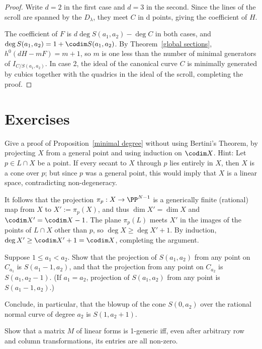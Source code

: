 \begin{proof} Write $d=2$ in the first case and $d=3$ in the second.
Since the lines of the scroll are spanned by the $D_\lambda$, they meet $C$ in d points, 
giving the coefficient of $H$. 

The coefficient of $F$ is $d\deg S(a_1,a_2) - \deg C$ in both cases, and 
$\deg S(a_1,a_2)= 1+ \codim  S(a_1,a_2)$. By Theorem~\ref{global sections}, 
$h^0(dH-mF) = m+1$, so $m$ is one less than the number of minimal generators
of $I_{C/S(a_1,a_2)}$. In case 2, the ideal of the canonical curve $C$ is minimally
generated by cubics together with  the quadrics in the ideal of the scroll, completing the proof. \end{proof}

\section{Exercises}

\begin{exercise}
 Give a proof of Proposition~\ref{minimal degree} without using Bertini's Theorem, by projecting $X$ from a general point and using induction on $\codim X$.
 Hint: Let $p\in L\cap X$ be a point. If every secant to $X$ through $p$ lies entirely in $X$, then $X$ is a cone over $p$; but since $p$ was a general point, this would imply that $X$ is a linear space, contradicting non-degeneracy. 

It follows that the projection $\pi_{p}:X \to \PP^{N-1}$ is a generically finite (rational) map from $X$ to $X' := \pi_{p}(X)$,
and thus $\dim X' = \dim X$ and $\codim X' = \codim X-1$. The plane 
$\pi_{p}(L)$ meets $X'$ in the images of the points of $L\cap X$ other than $p$, so
$\deg X\geq \deg X'+1$. By induction, $\deg X' \geq \codim X'+1 = \codim X$, completing the argument.
\end{exercise}

\begin{exercise}\label{special projections}
Suppose $1\leq a_1 < a_2$. Show that the projection of $S(a_1,a_2)$ from any point on $C_{a_1}$ is 
$S(a_1-1, a_2)$, and that the projection from any point on $C_{a_2}$ is $S(a_1, a_2-1)$. (If $a_1 = a_2$, projection of $S(a_1,a_2)$ from any point is $S(a_1-1, a_2)$.)

Conclude, in particular, that the blowup of the cone $S(0,a_2)$ over the rational normal curve of degree $a_2$ is $S(1,a_2+1)$.  
\end{exercise}

\begin{exercise}
Show that a matrix $M$ of linear forms is 1-generic iff, even after arbitrary row and column transformations, its entries are all non-zero.
\end{exercise}

